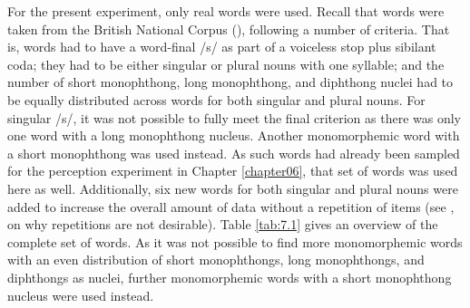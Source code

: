 For the present experiment, only real words were used. Recall that words were taken from the British National Corpus (\cite{Davies2004}), following a number of criteria. That is, words had to have a word-final /s/ as part of a voiceless stop plus sibilant coda; they had to be either singular or plural nouns with one syllable; and the number of short monophthong, long monophthong, and diphthong nuclei had to be equally distributed across words for both singular and plural nouns. For singular /s/, it was not possible to fully meet the final criterion as there was only one word with a long monophthong nucleus. Another monomorphemic word with a short monophthong was used instead. As such words had already been sampled for the perception experiment in Chapter \ref{chapter06}, that set of words was used here as well. Additionally, six new words for both singular and plural nouns were added to increase the overall amount of data without a repetition of items (see \cite{Winter2021Grice}, on why repetitions are not desirable). Table \ref{tab:7.1} gives an overview of the complete set of words. As it was not possible to find more monomorphemic words with an even distribution of short monophthongs, long monophthongs, and diphthongs as nuclei, further monomorphemic words with a short monophthong nucleus were used instead.

